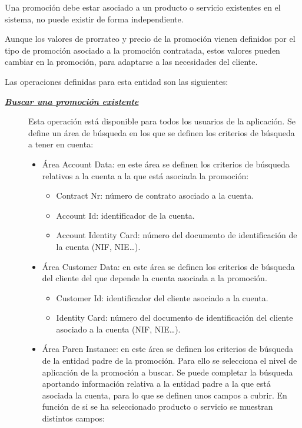 Una promoción debe estar asociado a un producto o servicio existentes en el sistema, no puede existir de forma independiente.

Aunque los valores de prorrateo y precio de la promoción vienen definidos por el tipo de promoción asociado a la promoción contratada, estos valores pueden cambiar en la promoción, para adaptarse a las necesidades del cliente.







Las operaciones definidas para esta entidad son las siguientes:
\begin{description}
\item[\underline{\textsl{\textbf{Buscar una promoción existente}}}] Esta operación está disponible para todos los usuarios de la aplicación.
Se define un área de búsqueda en los que se definen los criterios de búsqueda a tener en cuenta:
\begin{itemize}
	\item Área Account Data: en este área se definen los criterios de búsqueda relativos a la cuenta a la que está asociada la promoción:
		\begin{itemize}
			\item Contract Nr: número de contrato asociado a la cuenta.
			\item Account Id: identificador de la cuenta.
			\item Account Identity Card: número del documento de identificación de la cuenta (NIF, NIE\dots).
		\end{itemize}
	\item Área Customer Data: en este área se definen los criterios de búsqueda del cliente del que depende la cuenta asociada a la promoción.
		\begin{itemize}
			\item Customer Id: identificador del cliente asociado a la cuenta.
			\item Identity Card: número del documento de identificación del cliente asociado a la cuenta (NIF, NIE\dots).
		\end{itemize}
	\item Área Paren Instance: en este área se definen los criterios de búsqueda de la entidad padre de la promoción. Para ello se selecciona el nivel de aplicación de la promoción a buscar. Se puede completar la búsqueda aportando información relativa a la entidad padre a la que está asociada la cuenta, para lo que se definen unos campos a cubrir. En función de si se ha seleccionado producto o servicio se muestran distintos campos:

\end{itemize}
\end{description}
